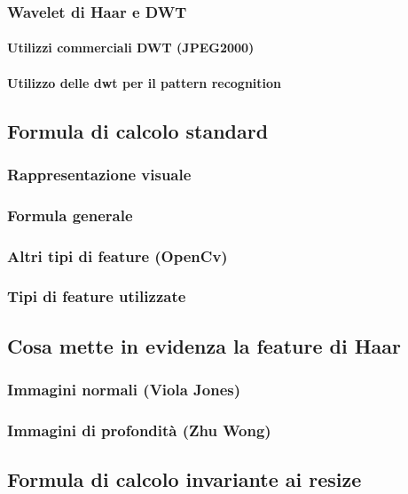             \subsubsection{Wavelet di Haar e DWT}
                \paragraph{Utilizzi commerciali DWT (JPEG2000)}
                \paragraph{Utilizzo delle dwt per il pattern recognition}
        \subsection{Formula di calcolo standard}
            \subsubsection{Rappresentazione visuale}
            \subsubsection{Formula generale}
            \subsubsection{Altri tipi di feature (OpenCv)}
            \subsubsection{Tipi di feature utilizzate}
        \subsection{Cosa mette in evidenza la feature di Haar}
            \subsubsection{Immagini normali (Viola Jones)}
            \subsubsection{Immagini di profondità (Zhu Wong)}
        \subsection{Formula di calcolo invariante ai resize}
